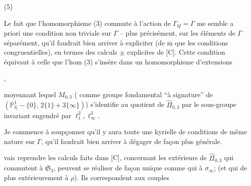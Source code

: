 (5)\quad
{}

Le fait que l'homomorphisme
(3) commute à l'action de $\Gamma_Q=\Gamma$
me semble  a priori une condition
non triviale sur $\Gamma$ -- plus
précisément, sur les éléments de
$\Gamma$ séparément, qu'il faudrait bien
arriver à expliciter (de $\overline{\mathrm m}$ que les
conditions congruentielles), en
termes des calculs $\pm$ explicites
de [C]. Cette condition équivaut
à celle que l'hom (3) s'insère
dans un homomorphisme d'extensions



,

moyennant lequel $M_{0,3}$ ( comme groupe fondamental ``à signature'' de $(\mathbb P^1_{\mathbb Q}-\{0\},\,2\{1\}+3\{\infty\})$) s'identifie au quotient de $\widehat{\Pi}_{0,3}$ par le sous-groupe invariant  engendré par $\ell_1^2,\ell_\infty^3$.

Je commence à soupçonner qu'il y aura toute une kyrielle de conditions de même nature sur $\Gamma$, qu'il faudrait bien arriver à dégager de façon plus générale.


 vais reprendre les calculs faits dans [C], concernant les  extérieurs de $\widehat{\Pi}_{0,3}$ qui commutent à $\mathfrak S_3$,   peuvent se réaliser de façon unique comme    qui  à $\sigma_\infty$; (et qui de plus  extérieurement à $\rho$). Ils correspondent  aux couples

